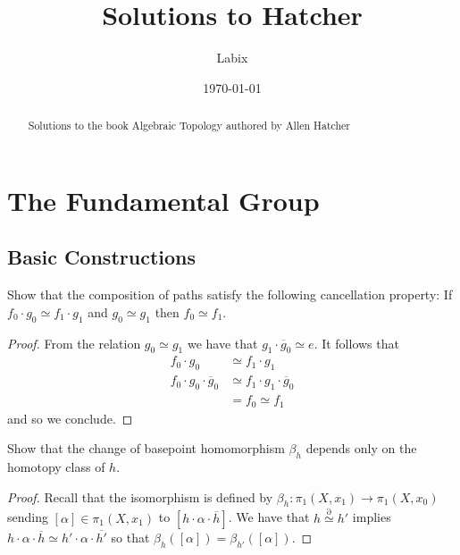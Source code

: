 \documentclass[a4paper]{article}
\title{Solutions to Hatcher}
\author{Labix}
\date{\today}
\begin{document}
\maketitle
\begin{abstract}
Solutions to the book Algebraic Topology authored by Allen Hatcher
\end{abstract}
\pagebreak
\tableofcontents
\pagebreak

\section{The Fundamental Group}
\subsection{Basic Constructions}
\begin{ex}{}{} Show that the composition of paths satisfy the following cancellation property: If $f_0\cdot g_0\simeq f_1\cdot g_1$ and $g_0\simeq g_1$ then $f_0\simeq f_1$. \tcbline
\begin{proof}
From the relation $g_0\simeq g_1$ we have that $g_1\cdot\overline{g}_0\simeq e$. It follows that 
\begin{align*}
f_0\cdot g_0&\simeq f_1\cdot g_1\\
f_0\cdot g_0\cdot\overline{g}_0&\simeq f_1\cdot g_1\cdot\overline{g}_0\\
&=f_0\simeq f_1
\end{align*}
and so we conclude. 
\end{proof}
\end{ex}

\begin{ex}{}{} Show that the change of basepoint homomorphism $\beta_h$ depends only on the homotopy class of $h$. \tcbline
\begin{proof}
Recall that the isomorphism is defined by $\beta_h:\pi_1(X,x_1)\to\pi_1(X,x_0)$ sending $[\alpha]\in\pi_1(X,x_1)$ to $[h\cdot\alpha\cdot\overline{h}]$. We have that $h\overset{\partial}{\simeq}h'$ implies $h\cdot\alpha\cdot\overline{h}\simeq h'\cdot\alpha\cdot\overline{h'}$ so that $\beta_h([\alpha])=\beta_{h'}([\alpha])$. 
\end{proof}
\end{ex}
\end{document}
